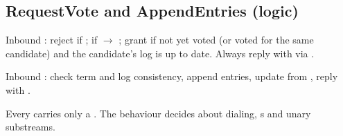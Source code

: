 \subsection{RequestVote and AppendEntries (logic)}

Inbound : reject if ; if  $\rightarrow$ ; grant if not yet voted (or voted for the same candidate) and the candidate's log is up to date. Always reply with  via .

Inbound : check term and log consistency, append entries, update  from , reply with .

\begin{invariantbox}
Every  carries only a . The behaviour decides about dialing, s and unary substreams.
\end{invariantbox}
